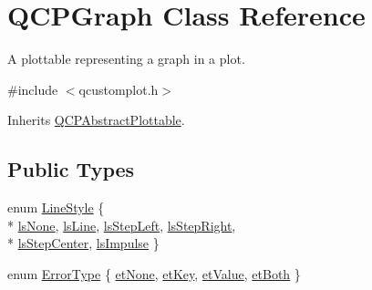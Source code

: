 \hypertarget{class_q_c_p_graph}{\section{Q\-C\-P\-Graph Class Reference}
\label{class_q_c_p_graph}
}


A plottable representing a graph in a plot.  




{\ttfamily \#include $<$qcustomplot.\-h$>$}



Inherits \hyperlink{class_q_c_p_abstract_plottable}{Q\-C\-P\-Abstract\-Plottable}.

\subsection*{Public Types}
\begin{DoxyCompactItemize}
\item 
enum \hyperlink{class_q_c_p_graph_ad60175cd9b5cac937c5ee685c32c0859}{Line\-Style} \{ \\*
\hyperlink{class_q_c_p_graph_ad60175cd9b5cac937c5ee685c32c0859aea9591b933733cc7b20786b71e60fa04}{ls\-None}, 
\hyperlink{class_q_c_p_graph_ad60175cd9b5cac937c5ee685c32c0859a3c42a27b15aa3c92d399082fad8b7515}{ls\-Line}, 
\hyperlink{class_q_c_p_graph_ad60175cd9b5cac937c5ee685c32c0859ae10568bda57836487d9dec5eba1d6c6e}{ls\-Step\-Left}, 
\hyperlink{class_q_c_p_graph_ad60175cd9b5cac937c5ee685c32c0859a9c37951f7d11aa070100fd16f2935c9e}{ls\-Step\-Right}, 
\\*
\hyperlink{class_q_c_p_graph_ad60175cd9b5cac937c5ee685c32c0859a5adf7b04da215a40a764c21294ea7366}{ls\-Step\-Center}, 
\hyperlink{class_q_c_p_graph_ad60175cd9b5cac937c5ee685c32c0859aa3b358b4ae7cca94aceeb8e529c12ebb}{ls\-Impulse}
 \}
\item 
enum \hyperlink{class_q_c_p_graph_ad23b514404bd2cb3216f57c90904d6af}{Error\-Type} \{ \hyperlink{class_q_c_p_graph_ad23b514404bd2cb3216f57c90904d6afaeae745e7cc1766bb8546e35d4b76a711}{et\-None}, 
\hyperlink{class_q_c_p_graph_ad23b514404bd2cb3216f57c90904d6afa2a5d89cd76fb8b6b18d71b8f6f6c0f43}{et\-Key}, 
\hyperlink{class_q_c_p_graph_ad23b514404bd2cb3216f57c90904d6afa147022ccdc49f6bd48f904cb4f61872e}{et\-Value}, 
\hyperlink{class_q_c_p_graph_ad23b514404bd2cb3216f57c90904d6afa761cb7d61670c1e2efecccd8974409ab}{et\-Both}
 \}
\end{DoxyCompactItemize}
